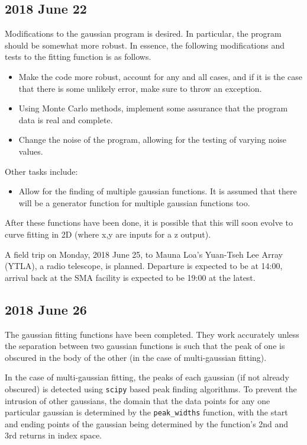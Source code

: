 \documentclass[twocolumn]{article}
\begin{document}
\subsection{2018 June 22}
\label{subsec:2018_June_22}

\begin{meetingnotes*}
	Modifications to the gaussian program is desired. In particular, the program should be somewhat more robust. In essence, the following modifications and tests to the fitting function is as follows.

	\begin{itemize}
		\item Make the code more robust, account for any and all cases, and if it is the case that there is some unlikely error, make sure to throw an exception.
		\item Using Monte Carlo methods, implement some assurance that the program data is real and complete.
		\item Change the noise of the program, allowing for the testing of varying noise values.
	\end{itemize}


	Other tasks include:
	\begin{itemize}
		\item Allow for the finding of multiple gaussian functions. It is assumed that there will be a generator function for multiple gaussian functions too.
	\end{itemize}
	After these functions have been done, it is possible that this will soon evolve to curve fitting in 2D (where x,y are inputs for a z output).
\end{meetingnotes*}

A field trip on Monday, 2018 June 25, to Mauna Loa's Yuan-Tseh Lee Array (YTLA), a radio telescope, is planned. Departure is expected to be at 14:00, arrival back at the SMA facility is expected to be 19:00 at the latest. 


\subsection{2018 June 26}
\label{2018_June_26}
The gaussian fitting functions have been completed. They work accurately unless the separation between two gaussian functions is such that the peak of one is obscured in the body of the other (in the case of multi-gaussian fitting). 

In the case of multi-gaussian fitting, the peaks of each gaussian (if not already obscured) is detected using \texttt{scipy} based peak finding algorithms. To prevent the intrusion of other gaussians, the domain that the data points for any one particular gaussian is determined by the \texttt{peak\_widths} function, with the start and ending points of the gaussian being determined by the function's 2nd and 3rd returns in index space.
\end{document}
